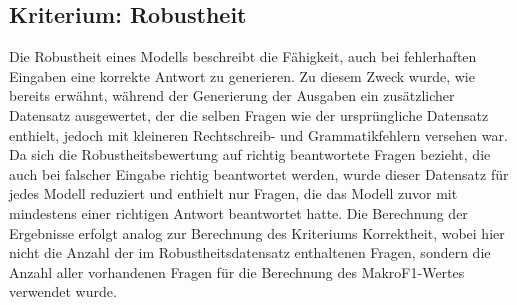 \subsection{Kriterium: Robustheit}
Die Robustheit eines Modells beschreibt die Fähigkeit, auch bei fehlerhaften Eingaben eine korrekte Antwort zu generieren.
Zu diesem Zweck wurde, wie bereits erwähnt, während der Generierung der Ausgaben ein zusätzlicher Datensatz ausgewertet, der die selben Fragen wie der ursprüngliche Datensatz enthielt, jedoch mit kleineren Rechtschreib- und Grammatikfehlern versehen war.
Da sich die Robustheitsbewertung auf richtig beantwortete Fragen bezieht, die auch bei falscher Eingabe richtig beantwortet werden, wurde dieser Datensatz für jedes Modell reduziert und enthielt nur Fragen, die das Modell zuvor mit mindestens einer richtigen Antwort beantwortet hatte.
Die Berechnung der Ergebnisse erfolgt analog zur Berechnung des Kriteriums Korrektheit, wobei hier nicht die Anzahl der im Robustheitsdatensatz enthaltenen Fragen, sondern die Anzahl aller vorhandenen Fragen für die Berechnung des MakroF1-Wertes verwendet wurde.
